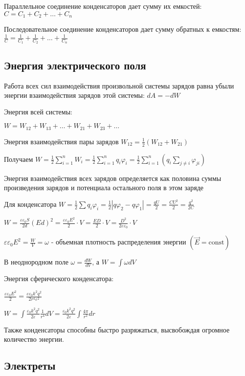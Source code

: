 \documentclass[12pt]{article}
\begin{document}
Параллельное соединение конденсаторов дает сумму их емкостей: $C = C_1 + C_2 + \dots + C_n$

Последовательное соединение конденсаторов дает сумму обратных к емкостям: $\frac{1}{C} = \frac{1}{C_1} + \frac{1}{C_2} + \dots + \frac{1}{C_n}$

\subsection{Энергия электрического поля}

Работа всех сил взаимодействия произвольной системы зарядов равна убыли энергии взаимодействия зарядов этой системы: $dA = -dW$

Энергия всей системы:

$W = W_{12} + W_{13} + \dots + W_{21} + W_{23} + \dots$

Энергия взаимодействия пары зарядов $W_{12} = \frac{1}{2} (W_{12} + W_{21})$

Получаем $W = \frac{1}{2} \sum_{i = 1}^n W_i = \frac{1}{2} \sum_{i = 1}^n q_i \varphi_i = \frac{1}{2}\sum_{i = 1}^n \left(q_i \sum_{j \neq i} \varphi_{ji}\right)$

Энергия взаимодействия всех зарядов определяется как половина суммы произведения зарядов и потенциала остального поля в этом заряде

Для конденсатора $W = \frac{1}{2} \sum q_i \varphi_i = \frac{1}{2} |q \varphi_2 - q \varphi_1| = \frac{qU}{2} = \frac{CU^2}{2} = \frac{q^2}{2C}$

$W = \frac{\varepsilon \varepsilon_0 S}{2d} (Ed)^2 = \frac{\varepsilon \varepsilon_0 E^2}{2} \cdot V = \frac{E D}{2} \cdot V = \frac{D^2}{2\varepsilon \varepsilon_0} \cdot V$

$\varepsilon \varepsilon_0 E^2 = \frac{W}{V} = \omega$ - объемная плотность распределения энергии $(\vec{E} = \mathrm{const})$

В неоднородном поле $\omega = \frac{dW}{dV}$, а $W = \int \omega dV$

Энергия сферического конденсатора:

$\frac{\varepsilon \varepsilon_0 E^2}{2} = \frac{\varepsilon \varepsilon_0 k^2 q^2}{2r^4 \varepsilon^2}$

$W = \int \frac{\varepsilon_0 k^2 q^2}{2\varepsilon} \frac{1}{r^4} dV = \frac{\varepsilon_0 k^2 q^2}{2\varepsilon} \int \frac{4\pi}{r^2} dr$

Также конденсаторы способны быстро разряжаться, высвобождая огромное количество энергии.

\subsection{Электреты}
\end{document}
